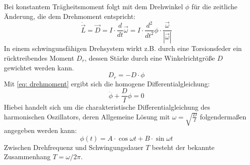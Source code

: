 Bei konstantem Trägheitsmoment folgt mit dem Drehwinkel $\phi$ für die zeitliche Änderung, die dem Drehmoment
entspricht:
\begin{equation}
  \dot{\vec{L}} = \vec{D} = I \cdot \frac{d}{dt}\vec{\omega} =
  I \cdot \frac{d^2}{dt^2} \phi \cdot \frac{\vec{\omega}}{|\vec{\omega}|}
  \label{eq: drehmoment}
\end{equation}
In einem schwingunsfähigen Drehsystem wirkt z.B. durch eine Torsionsfeder ein
rücktreibendes Moment $D_{r}$, dessen Stärke durch eine Winkelrichtgröße $D$ gewichtet
werden kann.
\begin{equation}
  D_{r} = - D \cdot \phi
\end{equation}
Mit \ref{eq: drehmoment} ergibt sich die homogene Differentialgleichung:
\begin{equation}
  \ddot{\phi} + \frac{D}{I}\phi = 0
\end{equation}
Hiebei handelt sich um die charakteristische Differentialgleichung des harmonischen
Oszillators, deren Allgemeine Lösung mit $\omega = \sqrt{\frac{D}{I}}$ folgendermaßen angegeben werden kann:
\begin{equation}
  \phi(t) = A\cdot \cos{\omega t} + B \cdot \sin{\omega t}
\end{equation}
Zwischen Drehfrequenz und Schwingungsdauer $T$ besteht der bekannte Zusammenhang
$T =\omega / 2\pi$. \\
